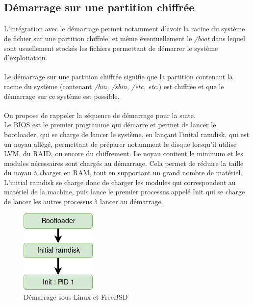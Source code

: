 \subsection{Démarrage sur une partition chiffrée}
\paragraph{}
L'intégration avec le démarrage permet notamment d'avoir la racine du système 
de fichier sur une partition chiffrée, et même éventuellement le {\em /boot}
dans lequel sont usuellement stockés les fichiers permettant de démarrer le 
système d'exploitation.

\paragraph{}
Le démarrage sur une partition chiffrée signifie que la partition contenant la
racine du système (contenant {\em/bin, /sbin, /etc, etc.}) est chiffrée et que
le démarrage sur ce système est possible.

\paragraph{}
On propose de rappeler la séquence de démarrage pour la suite.
\\
Le BIOS est le premier programme qui démarre et permet de lancer le bootloader, 
qui se charge de lancer le système, en lançant l'inital ramdisk, qui est un noyau
allégé, permettant de préparer notamment le disque lorsqu'il utilise LVM, du 
RAID, ou encore du chiffrement. Le noyau contient le minimum et les modules
nécessaires sont chargés au démarrage. Cela permet de réduire la taille du noyau
à charger en RAM, tout en supportant un grand nombre de matériel. L'initial
ramdisk se charge donc de charger les modules qui correspondent au matériel de
la machine, puis lance le premier processus appelé Init qui se charge de lancer
les autres processus à lancer au démarrage.


\begin{figure}[h]
\centering
\includegraphics[width=.2\linewidth]{etat_art/Demarrage.png}
\caption{\label{fig:demarrage}Démarrage sous Linux et FreeBSD}
\end{figure}

